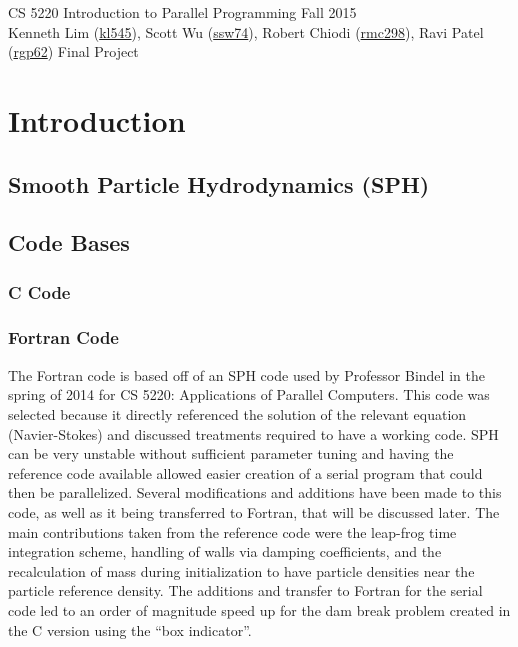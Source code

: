 \documentclass{scrartcl}
\begin{document}
  \begin{framed}
  CS 5220 Introduction to Parallel Programming \hfill Fall 2015 \\
  Kenneth Lim (\href{mailto:kl545@cornell.edu}{kl545}), Scott Wu (\href{mailto:ssw74@cornell.edu}{ssw74}), Robert Chiodi (\href{mailto:rmc298@cornell.edu}{rmc298}), Ravi Patel (\href{mailto:rgp62@cornell.edu}{rgp62})  \hfill Final Project \hspace{-3ex}
  \end{framed}
  
  
  \section{Introduction}
  
  \subsection{Smooth Particle Hydrodynamics (SPH)}
  
  \subsection{Code Bases}
  \subsubsection{C Code}
  
  
  \subsubsection{Fortran Code}
    The Fortran code is based off of an SPH code used by Professor Bindel in the spring of 2014 for CS 5220: Applications of Parallel Computers. This code was selected because it directly referenced the solution of the relevant equation (Navier-Stokes) and discussed treatments required to have a working code. SPH can be very unstable without sufficient parameter tuning and having the reference code available allowed easier creation of a serial program that could then be parallelized. Several modifications and additions have been made to this code, as well as it being transferred to Fortran, that will be discussed later. The main contributions taken from the reference code were the leap-frog time integration scheme, handling of walls via damping coefficients, and the recalculation of mass during initialization to have particle densities near the particle reference density. The additions and transfer to Fortran for the serial code led to an order of magnitude speed up for the dam break problem created in the C version using the ``box indicator''. 
    
\end{document}
